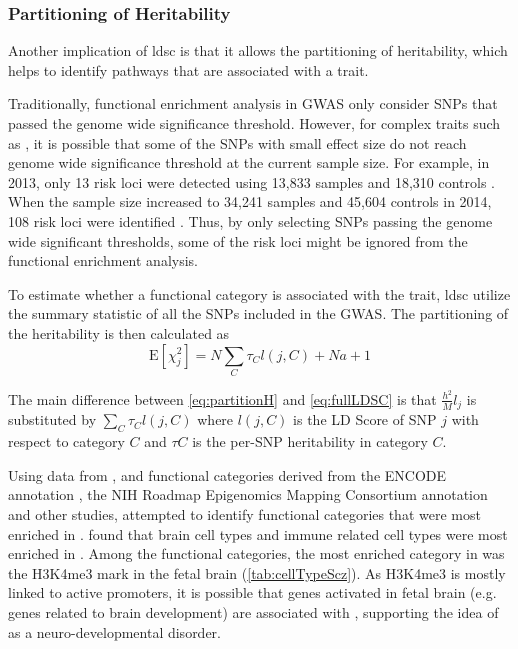	\subsubsection{Partitioning of Heritability}
	Another implication of \gls{ldsc} is that it allows the partitioning of heritability, which helps to identify pathways that are associated with a trait.
	
	Traditionally, functional enrichment analysis in \gls{GWAS} only consider \glspl{SNP} that passed the genome wide significance threshold. 
	However, for complex traits such as , it is possible that some of the \glspl{SNP} with small effect size do not reach genome wide significance threshold at the current sample size.
	For example, in 2013, only 13 risk loci were detected using 13,833  samples and 18,310 controls \citep{Ripke2013}. 
	When the sample size increased to 34,241  samples and 45,604 controls in 2014, 108 risk loci were identified \citep{Ripke2014}. 
	Thus, by only selecting \glspl{SNP} passing the genome wide significant thresholds, some of the risk loci might be ignored from the functional enrichment analysis.
	
	To estimate whether a functional category is associated with the trait, \gls{ldsc} utilize the summary statistic of all the \glspl{SNP} included in the \gls{GWAS}.
	The partitioning of the heritability is then calculated as 
	\begin{equation}
	\mathrm{E}[\chi^2_j] = N\sum_C\tau_Cl(j,C)+Na+1
	\label{eq:partitionH}
	\end{equation}
	
	The main difference between \cref{eq:partitionH} and \cref{eq:fullLDSC} is that $\frac{h^2}{M}l_j$ is substituted by $\sum_C\tau_Cl(j,C)$ where $l(j,C)$ is the \gls{LD} Score of \gls{SNP} $j$ with respect to category $C$ and $\tau C$ is the per-\gls{SNP} heritability in category $C$.
	
	Using data from \citet{Ripke2014}, and functional categories derived from the ENCODE annotation \citep{ENCODEProjectConsortium2012}, the NIH Roadmap Epigenomics Mapping Consortium annotation \citep{Bernstein2010} and other studies, \citet{Finucane2015} attempted to identify functional categories that were most enriched in .
	\citet{Finucane2015} found that brain cell types and immune related cell types were most enriched in .
	Among the functional categories, the most enriched category in  was the H3K4me3 mark in the fetal brain (\cref{tab:cellTypeScz}). 
	As H3K4me3 is mostly linked to active promoters, it is possible that genes activated in fetal brain (e.g. genes related to brain development) are associated with , supporting the idea of  as a neuro-developmental disorder. 
	
